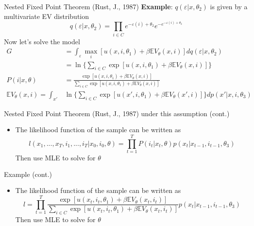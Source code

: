 \documentclass[10pt]{beamer}
\begin{document}
\begin{frame}{Nested Fixed Point Theorem (Rust, J., 1987)}
\textbf{Example}: $q(\varepsilon|x,\theta_2)$ is given by a multivariate EV distribution
$$q(\varepsilon|x,\theta_2)=\prod_{i\in C}e^{-\varepsilon(i)+\theta_2}e^{-e^{-\varepsilon(i)+\theta_2}}$$
Now let's solve the model
\begin{align*}
	G &= \int_\varepsilon \max_i [u(x,i,\theta_1)+\beta\mathbb{E}V_\theta(x,i)]dq(\varepsilon|x,\theta_2)\\
	& = \ln \bigg\{\sum_{i\in C} \exp[u(x,i,\theta_1)+\beta\mathbb{E}V_\theta(x,i)]\bigg\}\\
	P(i|x,\theta) &=\frac{\exp[u(x,i,\theta_1)+\beta\mathbb{E}V_\theta(x,i)]}{\sum_{i\in C}\exp[u(x,i,\theta_1)+\beta\mathbb{E}V_\theta(x,i)]}\\
	\mathbb{E}V_\theta(x,i)=\int_{x'}&\ln \bigg\{\sum_{i\in C} \exp[u(x',i,\theta_1)+\beta\mathbb{E}V_\theta(x',i)]\bigg\} dp(x'|x,i,\theta_3)
\end{align*}

\end{frame}


\begin{frame}{Nested Fixed Point Theorem (Rust, J., 1987)}
under this assumption (cont.)
\begin{itemize}
	\item The likelihood function of the sample can be written as 
	$$l(x_1,...,x_T, i_1,...,i_T|x_0,i_0,\theta)=\prod_{t=1}^TP(i_t|x_t,\theta)p(x_t|x_{t-1},i_{t-1},\theta_3)$$
	Then use MLE to solve for $\theta$
\end{itemize}
Example (cont.)
\begin{itemize}
	\item The likelihood function of the sample can be written as 
	$$l=\prod_{t=1}^T\frac{\exp[u(x_t,i_t,\theta_1)+\beta\mathbb{E}V_\theta(x_t,i_t)]}{\sum_{i\in C}\exp[u(x_t,i_t,\theta_1)+\beta\mathbb{E}V_\theta(x_t,i_t)]}p(x_t|x_{t-1},i_{t-1},\theta_3)$$
	Then use MLE to solve for $\theta$
\end{itemize}
\end{frame}
\end{document}
